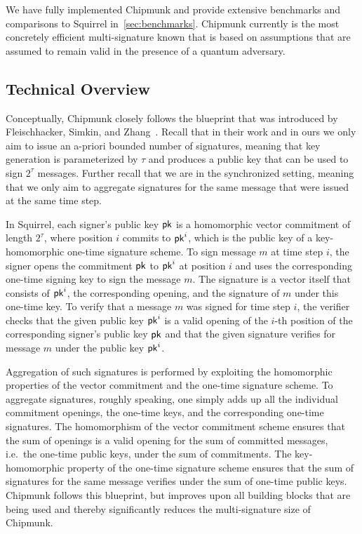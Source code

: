 We have fully implemented Chipmunk and provide extensive benchmarks and comparisons to Squirrel in~\autoref{sec:benchmarks}.
Chipmunk currently is the most concretely efficient multi-signature known that is based on assumptions that are assumed to remain valid in the presence of a quantum adversary.

\subsection{Technical Overview}\label{sec:intro-tech-overview}

Conceptually, Chipmunk closely follows the blueprint that was introduced by Fleischhacker, Simkin, and Zhang~\cite{CCS:FleSimZha22}.
Recall that in their work and in ours we only aim to issue an a-priori bounded number of signatures, meaning that key generation is parameterized by $\tau$ and produces a public key that can be used to sign $2^\tau$ messages.
Further recall that we are in the synchronized setting, meaning that we only aim to aggregate signatures for the same message that were issued at the same time step.

In Squirrel, each signer's public key $\mathsf{pk}$ is a homomorphic vector commitment of length $2^\tau$, where position $i$ commits to $\mathsf{pk}^i$, which is the public key of a key-homomorphic one-time signature scheme.
To sign message $m$ at time step $i$, the signer opens the commitment $\mathsf{pk}$ to $\mathsf{pk}^i$ at position $i$ and uses the corresponding one-time signing key to sign the message $m$.
The signature is a vector itself that consists of $\mathsf{pk}^i$, the corresponding opening, and the signature of $m$ under this one-time key.
To verify that a message $m$ was signed for time step $i$, the verifier checks that the given public key $\mathsf{pk}^i$ is a valid opening of the $i$-th position of the corresponding signer's public key $\mathsf{pk}$ and that the given signature verifies for message $m$ under the public key $\mathsf{pk}^i$.

Aggregation of such signatures is performed by exploiting the homomorphic properties of the vector commitment and the one-time signature scheme.
To aggregate signatures, roughly speaking, one simply adds up all the individual commitment openings, the one-time keys, and the corresponding one-time signatures.
The homomorphism of the vector commitment scheme ensures that the sum of openings is a valid opening for the sum of committed messages, i.e.\ the one-time public keys, under the sum of commitments.
The key-homomorphic property of the one-time signature scheme ensures that the sum of signatures for the same message verifies under the sum of one-time public keys.
Chipmunk follows this blueprint, but improves upon all building blocks that are being used and thereby significantly reduces the multi-signature size of Chipmunk.

